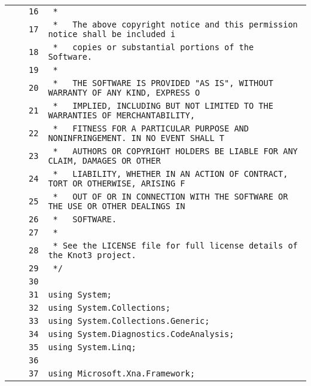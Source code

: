 \documentclass[a4paper,10pt]{article}
\begin{document}
\begin{longtable}[l]{lrrl}
\cellcolor{gray} &  & \verb~16~ & \verb~ *~\\
\cellcolor{gray} &  & \verb~17~ & \verb~ *   The above copyright notice and this permission notice shall be included i~\\
\cellcolor{gray} &  & \verb~18~ & \verb~ *   copies or substantial portions of the Software.~\\
\cellcolor{gray} &  & \verb~19~ & \verb~ *~\\
\cellcolor{gray} &  & \verb~20~ & \verb~ *   THE SOFTWARE IS PROVIDED "AS IS", WITHOUT WARRANTY OF ANY KIND, EXPRESS O~\\
\cellcolor{gray} &  & \verb~21~ & \verb~ *   IMPLIED, INCLUDING BUT NOT LIMITED TO THE WARRANTIES OF MERCHANTABILITY,~\\
\cellcolor{gray} &  & \verb~22~ & \verb~ *   FITNESS FOR A PARTICULAR PURPOSE AND NONINFRINGEMENT. IN NO EVENT SHALL T~\\
\cellcolor{gray} &  & \verb~23~ & \verb~ *   AUTHORS OR COPYRIGHT HOLDERS BE LIABLE FOR ANY CLAIM, DAMAGES OR OTHER~\\
\cellcolor{gray} &  & \verb~24~ & \verb~ *   LIABILITY, WHETHER IN AN ACTION OF CONTRACT, TORT OR OTHERWISE, ARISING F~\\
\cellcolor{gray} &  & \verb~25~ & \verb~ *   OUT OF OR IN CONNECTION WITH THE SOFTWARE OR THE USE OR OTHER DEALINGS IN~\\
\cellcolor{gray} &  & \verb~26~ & \verb~ *   SOFTWARE.~\\
\cellcolor{gray} &  & \verb~27~ & \verb~ *~\\
\cellcolor{gray} &  & \verb~28~ & \verb~ * See the LICENSE file for full license details of the Knot3 project.~\\
\cellcolor{gray} &  & \verb~29~ & \verb~ */~\\
\cellcolor{gray} &  & \verb~30~ & \verb~~\\
\cellcolor{gray} &  & \verb~31~ & \verb~using System;~\\
\cellcolor{gray} &  & \verb~32~ & \verb~using System.Collections;~\\
\cellcolor{gray} &  & \verb~33~ & \verb~using System.Collections.Generic;~\\
\cellcolor{gray} &  & \verb~34~ & \verb~using System.Diagnostics.CodeAnalysis;~\\
\cellcolor{gray} &  & \verb~35~ & \verb~using System.Linq;~\\
\cellcolor{gray} &  & \verb~36~ & \verb~~\\
\cellcolor{gray} &  & \verb~37~ & \verb~using Microsoft.Xna.Framework;~\\

\end{longtable}
\end{document}
